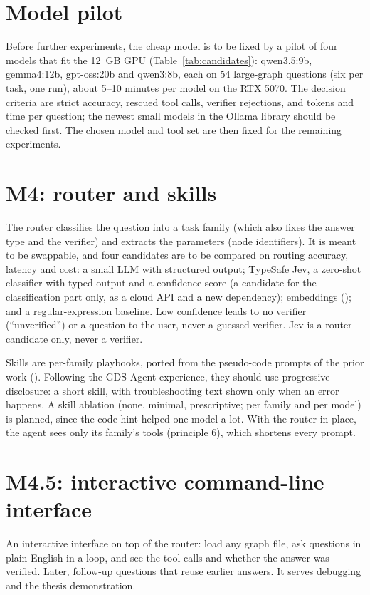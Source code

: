 \section{Model pilot}

Before further experiments, the cheap model is to be fixed by a pilot of four models that fit the 12~GB GPU
(Table~\ref{tab:candidates}): qwen3.5:9b, gemma4:12b, gpt-oss:20b and qwen3:8b, each on 54 large-graph questions (six
per task, one run), about 5--10 minutes per model on the RTX 5070. The decision criteria are strict accuracy, rescued
tool calls, verifier rejections, and tokens and time per question; the newest small models in the Ollama library
should be checked first. The chosen model and tool set are then fixed for the remaining experiments.

\section{M4: router and skills}
\label{sec:m4}

The router classifies the question into a task family (which also fixes the answer type and the verifier) and
extracts the parameters (node identifiers). It is meant to be swappable, and four candidates are to be compared on
routing accuracy, latency and cost: a small LLM with structured output; TypeSafe Jev, a zero-shot classifier with typed
output and a confidence score (a candidate for the classification part only, as a cloud API and a new dependency);
embeddings (); and a regular-expression baseline. Low confidence leads to no verifier
(``unverified'') or a question to the user, never a guessed verifier. Jev is a router candidate only, never a verifier.

Skills are per-family playbooks, ported from the pseudo-code prompts of the prior work ().
Following the GDS Agent experience, they should use progressive disclosure: a short skill, with troubleshooting text
shown only when an error happens. A skill ablation (none, minimal, prescriptive; per family and per model) is planned,
since the code hint helped one model a lot. With the router in place, the agent sees only its family's tools
(principle 6), which shortens every prompt.

\section{M4.5: interactive command-line interface}

An interactive interface on top of the router: load any graph file, ask questions in plain English in a loop, and see
the tool calls and whether the answer was verified. Later, follow-up questions that reuse earlier answers. It serves
debugging and the thesis demonstration.

